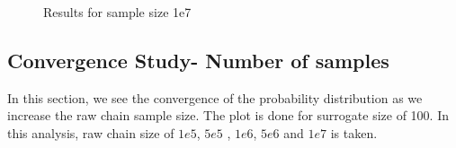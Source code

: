 \begin{figure}[H]
    \caption{Results for sample size 1e7}
\end{figure}


\subsection{Convergence Study- Number of samples }

 In this section, we see the convergence of the probability distribution as we increase the raw chain sample size. The plot is done for surrogate size of 100. In this analysis, raw chain size of $1e5$, $5e5$ , $1e6$, $5e6$ and $1e7$ is taken. 

